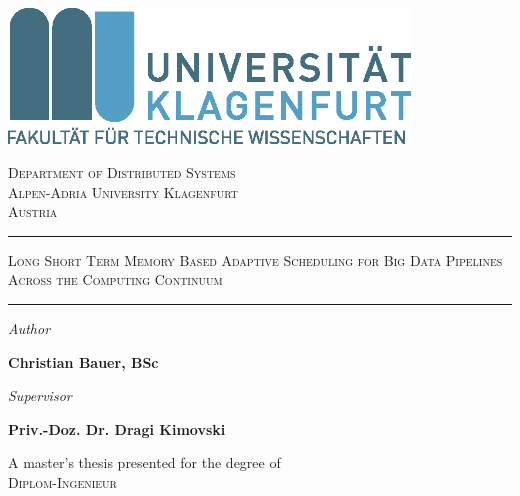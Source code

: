 \begin{titlingpage}
    \begin{center}
        \includegraphics[width=0.8\textwidth]{figures/AAU_LOGO_2017.png}

        \vspace{0.5cm}

        \textsc{Department of Distributed Systems}\\
        \textsc{Alpen-Adria University Klagenfurt}\\
        \textsc{Austria}\\

        \date{\today}

        \vspace{3.5cm}

        \LARGE
        \par\rule{\textwidth}{2pt}
        \textsc{Long Short Term Memory Based Adaptive Scheduling for Big Data Pipelines Across the Computing Continuum}
        \par\rule{\textwidth}{2pt} 
        \vspace{0.5cm}
            
        \vspace{3cm}

        \large
        \begin{minipage}{.5\textwidth}
            \textsl{Author}

            \textbf{Christian Bauer, BSc}

        \end{minipage}%
        \begin{minipage}{.5\textwidth}
            \textsl{Supervisor}

            \textbf{Priv.-Doz. Dr. Dragi Kimovski}
        \end{minipage}



       \vfill
            
       A master's thesis presented for the degree of\\
       \textsc{Diplom-Ingenieur}
            
     
            
    \end{center}
\end{titlingpage}